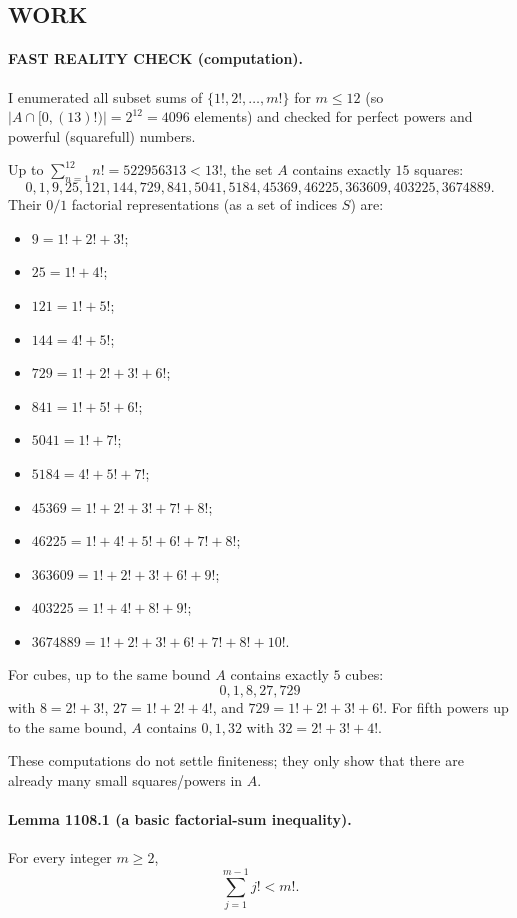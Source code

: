 \subsection*{WORK}
\paragraph{FAST REALITY CHECK (computation).}
I enumerated all subset sums of $\{1!,2!,\dots,m!\}$ for $m\le 12$ (so $|A\cap[0,(13)! )|=2^{12}=4096$ elements) and checked for perfect powers and powerful (squarefull) numbers.

Up to $\sum_{n=1}^{12} n! = 522956313 < 13!$, the set $A$ contains exactly $15$ squares:
\[
0,1,9,25,121,144,729,841,5041,5184,45369,46225,363609,403225,3674889.
\]
Their $0/1$ factorial representations (as a set of indices $S$) are:
\begin{itemize}
\item $9=1!+2!+3!$;
\item $25=1!+4!$;
\item $121=1!+5!$;
\item $144=4!+5!$;
\item $729=1!+2!+3!+6!$;
\item $841=1!+5!+6!$;
\item $5041=1!+7!$;
\item $5184=4!+5!+7!$;
\item $45369=1!+2!+3!+7!+8!$;
\item $46225=1!+4!+5!+6!+7!+8!$;
\item $363609=1!+2!+3!+6!+9!$;
\item $403225=1!+4!+8!+9!$;
\item $3674889=1!+2!+3!+6!+7!+8!+10!$.
\end{itemize}
For cubes, up to the same bound $A$ contains exactly $5$ cubes:
\[0,1,8,27,729\]
with $8=2!+3!$, $27=1!+2!+4!$, and $729=1!+2!+3!+6!$.
For fifth powers up to the same bound, $A$ contains $0,1,32$ with $32=2!+3!+4!$.

These computations do not settle finiteness; they only show that there are already many small squares/powers in $A$.

\paragraph{Lemma 1108.1 (a basic factorial-sum inequality).}
For every integer $m\ge 2$,
\[\sum_{j=1}^{m-1} j! < m!.\]

